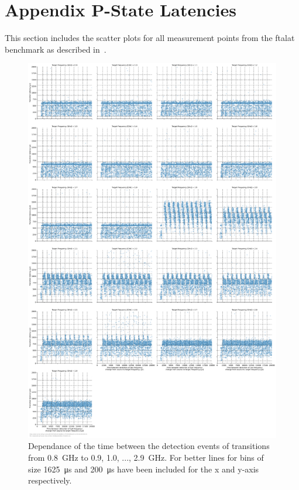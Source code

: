 \chapter{Appendix P-State Latencies}
\label{app:pstate_latencies_scatter_complete}
This section includes the scatter plots for all measurement points from the ftalat benchmark as described in~.

\begin{figure}[]
    \centering
    \includegraphics[width=\columnwidth]{fig/ftalat/ftalat_scatter_wait_transition_latency_hati_source_0.8.pdf}
    \caption{Dependance of the time between the detection events of transitions from \SI{0.8}{\GHz} to \SI{0.9}{}, \SI{1.0}{}, ..., \SI{2.9}{\GHz}. For better lines for bins of size \SI{1625}{\us} and \SI{200}{\us} have been included for the x and y-axis respectively.}
\end{figure}
